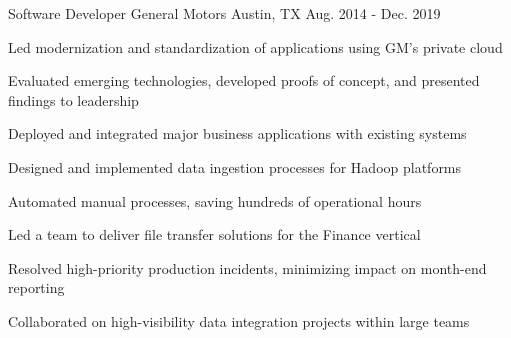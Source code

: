\begin{cventries}
  \cventry
    {Software Developer}
    {General Motors}
    {Austin, TX}
    {Aug. 2014 - Dec. 2019}
    {
      \begin{cvitems}
        \item {Led modernization and standardization of applications using GM's private cloud}
        \item {Evaluated emerging technologies, developed proofs of concept, and presented findings to leadership}
        \item {Deployed and integrated major business applications with existing systems}
        \item {Designed and implemented data ingestion processes for Hadoop platforms}
        \item {Automated manual processes, saving hundreds of operational hours}
        \item {Led a team to deliver file transfer solutions for the Finance vertical}
        \item {Resolved high-priority production incidents, minimizing impact on month-end reporting}
        \item {Collaborated on high-visibility data integration projects within large teams}
      \end{cvitems}
    }

\end{cventries}

